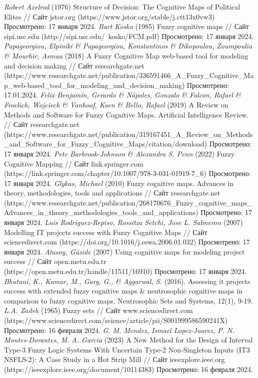 \documentclass{article}
\begin{document}
\begin{thebibliography}{}
         \textit{Robert Axelrod} (1976) Structure of Decision: The Cognitive Maps of Political Elites // Сайт jstor.org (https://www.jstor.org/stable/j.ctt13x0vw3) Просмотрено: 17 января 2024.
         \textit{Bart Kosko} (1985) Fuzzy cognitive maps // Сайт sipi.usc.edu (http://sipi.usc.edu/~kosko/FCM.pdf) Просмотрено: 17 января 2024.
         \textit{Papageorgiou, Elpiniki \& Papageorgiou, Konstantinos \& Dikopoulou, Zoumpoulia \& Mourhir, Asmaa} (2018) A Fuzzy Cognitive Map web-based tool for modeling and decision making // Сайт researchgate.net (https://www.researchgate.net/publication/336591466\_A\_Fuzzy\_Cognitive\_Map\_web-based\_tool\_for\_modeling\_and\_decision\_making) Просмотрено: 17.01.2024.
         \textit{Felix Benjamín, Gerardo \& Nápoles, Gonzalo \& Falcon, Rafael \& Froelich, Wojciech \& Vanhoof, Koen \& Bello, Rafael} (2019) A Review on Methods and Software for Fuzzy Cognitive Maps. Artificial Intelligence Review. // Сайт researchgate.net (https://www.researchgate.net/publication/319167451\_A\_Review\_on\_Methods\_and\_Software\_for\_Fuzzy\_Cognitive\_Maps/citation/download) Просмотрено: 17 января 2024.
         \textit{Pete Barbrook-Johnson \& Alexandra S. Penn} (2022) Fuzzy Cognitive Mapping // Сайт link.springer.com (https://link.springer.com/chapter/10.1007/978-3-031-01919-7\_6) Просмотрено: 17 января 2024.
         \textit{Glykas, Michael} (2010) Fuzzy cognitive maps. Advances in theory, methodologies, tools and applications // Сайт researchgate.net (https://www.researchgate.net/publication/268170676\_Fuzzy\_cognitive\_maps\_Advances\_in\_theory\_methodologies\_tools\_and\_applications) Просмотрено: 17 января 2024.
         \textit{Luis Rodriguez-Repiso, Rossitza Setchi, Jose L. Salmeron} (2007) Modelling IT projects success with Fuzzy Cognitive Maps // Сайт sciencedirect.com (https://doi.org/10.1016/j.eswa.2006.01.032) Просмотрено: 17 января 2024.
         \textit{Atasoy, Güzide} (2007) Using cognitive maps for modeling project success // Сайт open.metu.edu.tr (https://open.metu.edu.tr/handle/11511/16910) Просмотрено: 17 января 2024.
         \textit{Bhutani, K., Kumar, M., Garg, G., \& Aggarwal, S.} (2016). Assessing it projects success with extended fuzzy cognitive maps \& neutrosophic cognitive maps in comparison to fuzzy cognitive maps. Neutrosophic Sets and Systems, 12(1), 9-19.
         \textit{L.A. Zadeh} (1965) Fuzzy sets // Сайт www.sciencedirect.com (https://www.sciencedirect.com/science/article/pii/S001999586590241X) Просмотрено: 16 февраля 2024.
         \textit{G. M. Mendez, Ismael Lopez-Juarez, P. N. Montes-Dorantes, M. A. Garcia} (2023) A New Method for the Design of Interval Type-3 Fuzzy Logic Systems With Uncertain Type-2 Non-Singleton Inputs (IT3 NSFLS-2): A Case Study in a Hot Strip Mill // Сайт ieeexplore.ieee.org (https://ieeexplore.ieee.org/document/10114383) Просмотрено: 16 февраля 2024.
    \end{thebibliography}
\end{document}
